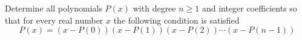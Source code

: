 Determine all polynomials $P(x)$ with degree $n\geq 1$ and integer coefficients so that for every real number $x$ the following condition is satisfied$$P(x)=(x-P(0))(x-P(1))(x-P(2))\cdots (x-P(n-1))$$